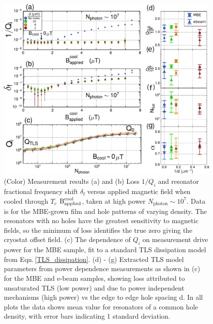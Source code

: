 \begin{figure}
\begin{center}

\includegraphics[width=400 pt]{DielectricFluxTrap_ExpData_arxiv_Rev2c_proof_revision1.pdf}

\end{center}
\caption{(Color) Measurement results  (a) and (b) Loss $1/Q_i$ and resonator fractional frequency shift $\delta_{\textrm{f}}$ versus applied magnetic field when cooled through $T_c$ $\text{B}^{\textrm{cool}}_{\textrm{applied}}$, taken at high power $N_\textrm{photon} \sim 10^7$.  Data is for the MBE-grown film and hole patterns of varying density.  The resonators with no holes have the greatest sensitivity to magnetic fields, so the minimum of loss identifies the true zero giving the cryostat offset field.  (c) The dependence of $Q_i$ on measurement drive power for the MBE sample, fit to a standard TLS dissipation model from Eqn.\,\ref{TLS_dissipation}.  (d) - (g) Extracted TLS model parameters from power dependence measurements as shown in (c) for the MBE and e-beam samples, showing loss attributed to unsaturated TLS (low power) and due to power independent mechanisms (high power) vs the edge to edge hole spacing d.  In all plots the data shows mean value for resonators of a common hole density, with error bars indicating 1 standard deviation.}
\label{Resonator Measurements}
\end{figure}

